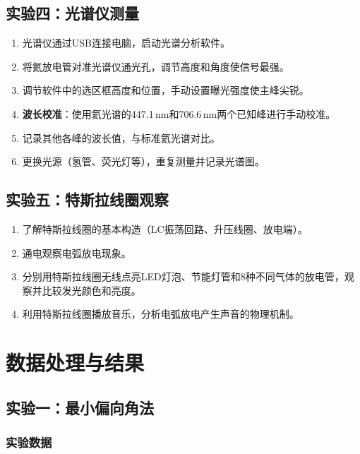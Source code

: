 \documentclass[UTF8]{article}
\begin{document}
\subsection{实验四：光谱仪测量}

\begin{enumerate}
    \item 光谱仪通过USB连接电脑，启动光谱分析软件。
    \item 将氦放电管对准光谱仪通光孔，调节高度和角度使信号最强。
    \item 调节软件中的选区框高度和位置，手动设置曝光强度使主峰尖锐。
    \item \textbf{波长校准}：使用氦光谱的447.1\,nm和706.6\,nm两个已知峰进行手动校准。
    \item 记录其他各峰的波长值，与标准氦光谱对比。
    \item 更换光源（氢管、荧光灯等），重复测量并记录光谱图。
\end{enumerate}

\subsection{实验五：特斯拉线圈观察}

\begin{enumerate}
    \item 了解特斯拉线圈的基本构造（LC振荡回路、升压线圈、放电端）。
    \item 通电观察电弧放电现象。
    \item 分别用特斯拉线圈无线点亮LED灯泡、节能灯管和8种不同气体的放电管，观察并比较发光颜色和亮度。
    \item 利用特斯拉线圈播放音乐，分析电弧放电产生声音的物理机制。
\end{enumerate}

\section{数据处理与结果}

\subsection{实验一：最小偏向角法}

\subsubsection{实验数据}
\end{document}
